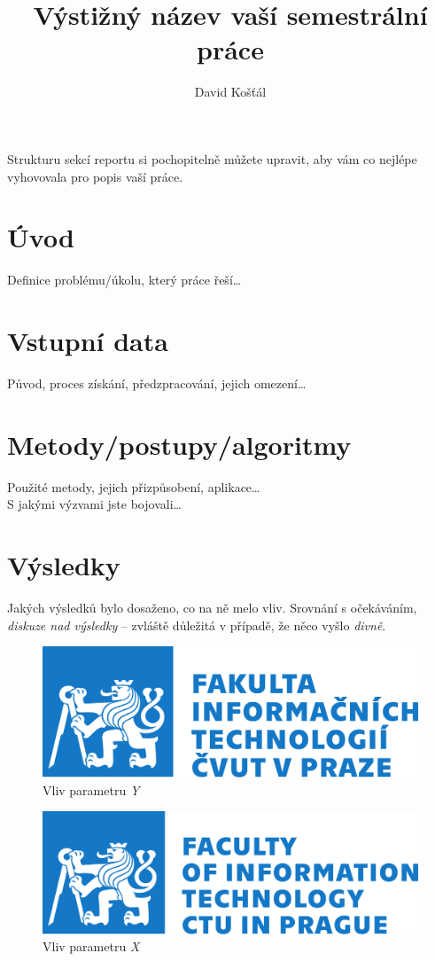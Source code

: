 \documentclass[czech]{template/pyt-report}
\title{Výstižný název vaší semestrální práce}
\author{David Košťál}
\affiliation{FIT ČVUT}
\begin{document}
\maketitle

Strukturu sekcí reportu si pochopitelně můžete upravit, aby vám co nejlépe vyhovovala pro popis vaší práce.

\section{Úvod}
Definice problému/úkolu, který práce řeší\ldots


\section{Vstupní data}
Původ, proces získání, předzpracování, jejich omezení\ldots

\section{Metody/postupy/algoritmy}
Použité metody, jejich přizpůsobení, aplikace\ldots \\
S jakými výzvami jste bojovali\ldots

\section{Výsledky}

Jakých výsledků bylo dosaženo, co na ně melo vliv. Srovnání s očekáváním, \emph{diskuze nad výsledky} -- zvláště důležitá v případě, že něco vyšlo \emph{divně}.

\begin{figure}[h]
  \centering\leavevmode
  \includegraphics[width=.45\linewidth]{template/img/fit-logo-cz.pdf}\vskip-0.5cm
  \caption{Vliv parametru \emph{Y}}
  \label{fig:par-y}
\end{figure}
\begin{figure}[h]
  \centering\leavevmode
  \includegraphics[width=.45\linewidth]{template/img/fit-logo-en.pdf}\vskip-0.5cm
  \caption{Vliv parametru \emph{X}}
  \label{fig:par-x}
\end{figure}
\end{document}
